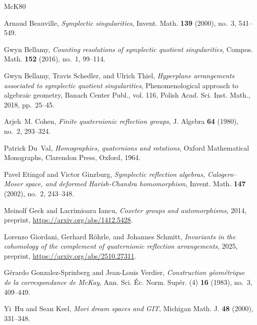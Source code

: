 \documentclass[a4paper]{amsart}
\theoremstyle{plain}
\theoremstyle{definition}
\theoremstyle{remark}
\begin{document}

\providecommand{\bysame}{\leavevmode\hbox to3em{\hrulefill}\thinspace}
\providecommand{\MR}{\relax\ifhmode\unskip\space\fi MR }
\providecommand{\MRhref}[2]{%
	\href{http://www.ams.org/mathscinet-getitem?mr=#1}{#2}
}
\providecommand{\href}[2]{#2}
\begin{thebibliography}{McK80}
	
	Arnaud Beauville, \emph{Symplectic singularities}, Invent. Math. \textbf{139}
	(2000), no.~3, 541--549.
	
	Gwyn Bellamy, \emph{Counting resolutions of symplectic quotient singularities},
	Compos. Math. \textbf{152} (2016), no.~1, 99--114.
	
	Gwyn Bellamy, Travis Schedler, and Ulrich Thiel, \emph{Hyperplane arrangements
		associated to symplectic quotient singularities}, Phenomenological approach
	to algebraic geometry, Banach Center Publ., vol. 116, Polish Acad. Sci. Inst.
	Math., 2018, pp.~25--45.
	
	Arjeh~M. Cohen, \emph{Finite quaternionic reflection groups}, J. Algebra
	\textbf{64} (1980), no.~2, 293--324.
	
	Patrick Du~Val, \emph{Homographies, quaternions and rotations}, Oxford
	Mathematical Monographs, Clarendon Press, Oxford, 1964.
	
	Pavel Etingof and Victor Ginzburg, \emph{Symplectic reflection algebras,
		{C}a\-lo\-ge\-ro--{M}oser space, and deformed {H}arish-{C}handra
		homomorphism}, Invent. Math. \textbf{147} (2002), no.~2, 243--348.
	
	Meinolf Geck and Lacrimioara Iancu, \emph{Coxeter groups and automorphisms},
	2014, preprint, \url{https://arxiv.org/abs/1412.5428}.
	
	Lorenzo Giordani, Gerhard Röhrle, and Johannes Schmitt, \emph{Invariants in
		the cohomology of the complement of quaternionic reflection arrangements},
	2025, preprint, \url{https://arxiv.org/abs/2510.27311}.
	
	Gérardo Gonzalez-Sprinberg and Jean-Louis Verdier, \emph{Con\-struc\-tion
		géo\-mé\-trique de la corres\-pon\-dance de {M}c{K}ay}, Ann. Sci. Éc.
	Norm. Supér. (4) \textbf{16} (1983), no.~3, 409--449.
	
	Yi~Hu and Sean Keel, \emph{Mori dream spaces and {GIT}}, Michigan Math. J.
	\textbf{48} (2000), 331--348.
	

\end{thebibliography}
\end{document}
